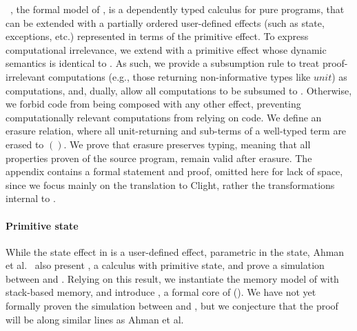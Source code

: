 \emf~\cite{dm4free}, the formal model of \fstar, is a
dependently typed calculus for pure programs, that can be extended
with a partially ordered user-defined effects (such as state,
exceptions, etc.) represented in terms of the primitive
 effect. %
To express computational irrelevance, we extend \emf with a
primitive  effect whose dynamic semantics is identical
to .
%
As such, we provide a subsumption rule to treat
proof-irrelevant  computations (e.g., those returning
non-informative types like \lst$unit$) as  computations, and,
dually,
%
allow all  computations to be subsumed
to . Otherwise, we forbid  code from being
composed with any other effect, preventing computationally relevant
computations from relying on  code.
%
We define an erasure relation, where all unit-returning 
and  sub-terms of a well-typed term are erased
to \lst$()$. We prove that erasure preserves typing, meaning that all
properties proven of the source program, remain valid after erasure.
%
The appendix contains a formal statement and proof, omitted here for
lack of space, since we focus mainly on the translation to Clight,
rather the transformations internal to \fstar.

\paragraph{Primitive state} While the state effect in \emf is a
user-defined effect, parametric in the state, Ahman et
al.~\cite{dm4free} also present \emfST, a calculus with primitive
state, and prove a simulation between \emfST and
\emf. Relying on this result, we instantiate the
memory model of \emfST with stack-based memory, and introduce
\lamstar, a formal core of \lowstar ().
We have not yet formally proven
the simulation between \emf and \lamstar, but we conjecture that the
proof will be along similar lines as Ahman et al.
